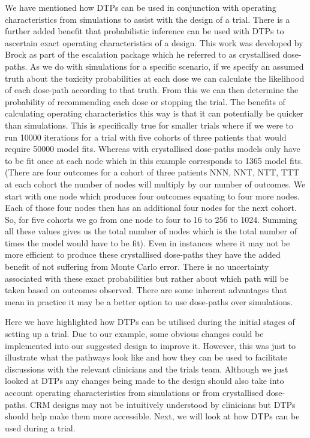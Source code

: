 We have mentioned how DTPs can be used in conjunction with operating characteristics from simulations to assist with the design of a trial. There is a further added benefit that probabilistic inference can be used with DTPs to ascertain exact operating characteristics of a design. This work was developed by Brock \cite{brockModularApproachDose2020} as part of the escalation package which he referred to as crystallised dose-paths. As we do with simulations for a specific scenario, if we specify an assumed truth about the toxicity probabilities at each dose we can calculate the likelihood of each dose-path according to that truth. From this we can then determine the probability of recommending each dose or stopping the trial. The benefits of calculating operating characteristics this way is that it can potentially be quicker than simulations. This is specifically true for smaller trials where if we were to run 10000 iterations for a trial with five cohorts of three patients that would require 50000 model fits. Whereas with crystallised dose-paths models only have to be fit once at each node which in this example corresponds to 1365 model fits. (There are four outcomes for a cohort of three patients NNN, NNT, NTT, TTT at each cohort the number of nodes will multiply by our number of outcomes. We start with one node which produces four outcomes equating to four more nodes. Each of those four nodes then has an additional four nodes for the next cohort. So, for five cohorts we go from one node to four to 16 to 256 to 1024. Summing all these values gives us the total number of nodes which is the total number of times the model would have to be fit). Even in instances where it may not be more efficient to produce these crystallised dose-paths they have the added benefit of not suffering from Monte Carlo error. There is no uncertainty associated with these exact probabilities but rather about which path will be taken based on outcomes observed. There are some inherent advantages that mean in practice it may be a better option to use dose-paths over simulations. 

Here we have highlighted how DTPs can be utilised during the initial stages of setting up a trial. Due to our example, some obvious changes could be implemented into our suggested design to improve it. However, this was just to illustrate what the pathways look like and how they can be used to facilitate discussions with the relevant clinicians and the trials team. Although we just looked at DTPs any changes being made to the design should also take into account operating characteristics from simulations or from crystallised dose-paths. CRM designs may not be intuitively understood by clinicians but DTPs should help make them more accessible. Next, we will look at how DTPs can be used during a trial.  

